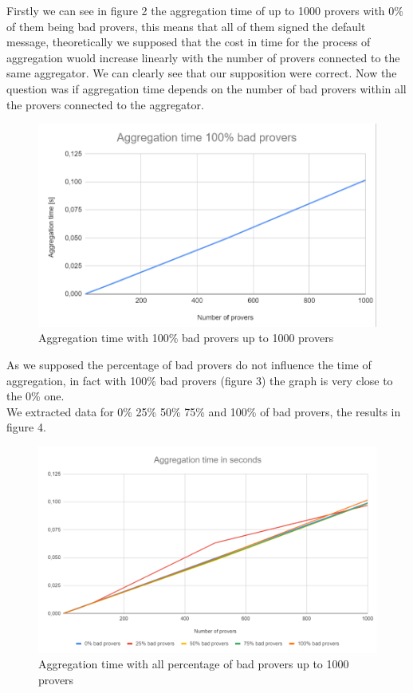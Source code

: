 \documentclass[10pt, a4paper, twocolumn]{article} %
\begin{document}
Firstly we can see in figure 2 the aggregation time of up to 1000 provers with 0\% of them being bad provers, this means that all of them signed the default message, theoretically we supposed that the cost in time 
for the process of aggregation wuold increase linearly with the number of provers connected to the same aggregator. We can clearly see that our supposition were correct.
Now the question was if aggregation time depends on the number of bad provers within all the provers connected to the aggregator.\\

\begin{figure}
	\includegraphics[width=\linewidth]{images/aggregation_100.png} %
	\caption{Aggregation time with 100\% bad provers up to 1000 provers} %
	\label{bear} %
\end{figure}

As we supposed the percentage of bad provers do not influence the time of aggregation, in fact with 100\% bad provers (figure 3) the graph is very close to the 0\% one.\\ 
We extracted data for 0\% 25\% 50\% 75\% and 100\% of bad provers, the results in figure 4.\\
\begin{figure}
	\includegraphics[width=\linewidth]{images/aggregation_comparison.png} %
	\caption{Aggregation time with all percentage of bad provers up to 1000 provers} %
	\label{bear} %
\end{figure}
\end{document}

